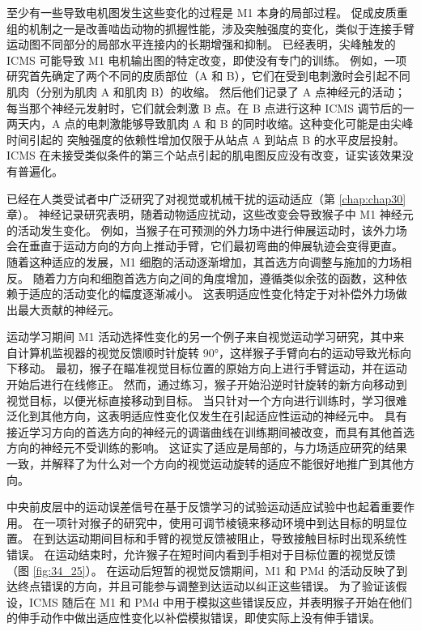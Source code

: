 至少有一些导致电机图发生这些变化的过程是 M1 本身的局部过程。 促成皮质重组的机制之一是改善啮齿动物的抓握性能，涉及突触强度的变化，类似于连接手臂运动图不同部分的局部水平连接内的长期增强和抑制。 已经表明，尖峰触发的 ICMS 可能导致 M1 电机输出图的特定改变，即使没有专门的训练。 例如，一项研究首先确定了两个不同的皮质部位（A 和 B），它们在受到电刺激时会引起不同肌肉（分别为肌肉 A 和肌肉 B）的收缩。 然后他们记录了 A 点神经元的活动； 每当那个神经元发射时，它们就会刺激 B 点。在 B 点进行这种 ICMS 调节后的一两天内，A 点的电刺激能够导致肌肉 A 和 B 的同时收缩。这种变化可能是由尖峰时间引起的 突触强度的依赖性增加仅限于从站点 A 到站点 B 的水平皮层投射。ICMS 在未接受类似条件的第三个站点引起的肌电图反应没有改变，证实该效果没有普遍化。

已经在人类受试者中广泛研究了对视觉或机械干扰的运动适应（第 \ref{chap:chap30} 章）。 神经记录研究表明，随着动物适应扰动，这些改变会导致猴子中 M1 神经元的活动发生变化。 例如，当猴子在可预测的外力场中进行伸展运动时，该外力场会在垂直于运动方向的方向上推动手臂，它们最初弯曲的伸展轨迹会变得更直。 随着这种适应的发展，M1 细胞的活动逐渐增加，其首选方向调整与施加的力场相反。 随着力方向和细胞首选方向之间的角度增加，遵循类似余弦的函数，这种依赖于适应的活动变化的幅度逐渐减小。 这表明适应性变化特定于对补偿外力场做出最大贡献的神经元。

运动学习期间 M1 活动选择性变化的另一个例子来自视觉运动学习研究，其中来自计算机监视器的视觉反馈顺时针旋转 90°，这样猴子手臂向右的运动导致光标向下移动。 最初，猴子在瞄准视觉目标位置的原始方向上进行手臂运动，并在运动开始后进行在线修正。 然而，通过练习，猴子开始沿逆时针旋转的新方向移动到视觉目标，以便光标直接移动到目标。 当只针对一个方向进行训练时，学习很难泛化到其他方向，这表明适应性变化仅发生在引起适应性运动的神经元中。 具有接近学习方向的首选方向的神经元的调谐曲线在训练期间被改变，而具有其他首选方向的神经元不受训练的影响。 这证实了适应是局部的，与力场适应研究的结果一致，并解释了为什么对一个方向的视觉运动旋转的适应不能很好地推广到其他方向。

中央前皮层中的运动误差信号在基于反馈学习的试验运动适应试验中也起着重要作用。 在一项针对猴子的研究中，使用可调节棱镜来移动环境中到达目标的明显位置。 在到达运动期间目标和手臂的视觉反馈被阻止，导致接触目标时出现系统性错误。 
在运动结束时，允许猴子在短时间内看到手相对于目标位置的视觉反馈（图 \ref{fig:34_25}）。 
在运动后短暂的视觉反馈期间，M1 和 PMd 的活动反映了到达终点错误的方向，并且可能参与调整到达运动以纠正这些错误。 为了验证该假设，ICMS 随后在 M1 和 PMd 中用于模拟这些错误反应，并表明猴子开始在他们的伸手动作中做出适应性变化以补偿模拟错误，即使实际上没有伸手错误。

